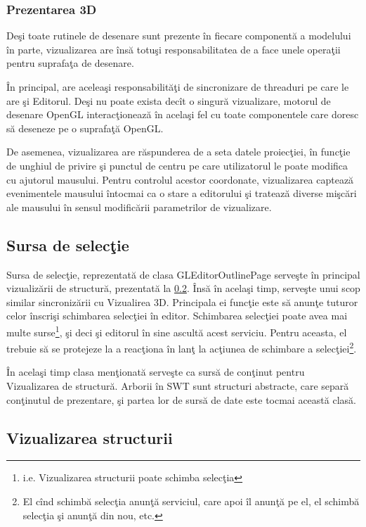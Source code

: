 \subsubsection{Prezentarea 3D}
Deşi toate rutinele de desenare sunt prezente în fiecare componentă a modelului
în parte, vizualizarea are însă totuşi responsabilitatea de a face unele
operaţii pentru suprafaţa de desenare.

În principal, are aceleaşi responsabilităţi de sincronizare de threaduri pe care
le are şi Editorul. Deşi nu poate exista decît o singură vizualizare, motorul de
desenare OpenGL interacţionează în acelaşi fel cu toate componentele care doresc
să deseneze pe o suprafaţă OpenGL.

De asemenea, vizualizarea are răspunderea de a seta datele proiecţiei, în
funcţie de unghiul de privire şi punctul de centru pe care utilizatorul le poate
modifica cu ajutorul mausului. Pentru controlul acestor coordonate, vizualizarea
captează evenimentele mausului întocmai ca o stare a editorului şi tratează
diverse mişcări ale mausului în sensul modificării parametrilor de vizualizare.

\subsection{Sursa de selecţie}
\label{section:impl-selecta}
Sursa de selecţie, reprezentată de clasa GLEditorOutlinePage serveşte în 
principal vizualizării de structură, prezentată la \ref{section:impl-outline}. 
Însă în acelaşi timp, serveşte unui scop similar sincronizării cu Vizualirea 
3D. Principala ei funcţie este să anunţe tuturor celor înscrişi schimbarea 
selecţiei în editor. Schimbarea selecţiei poate avea mai multe 
surse\footnote{i.e. Vizualizarea structurii poate schimba selecţia}, şi deci şi 
editorul în sine ascultă acest serviciu. Pentru aceasta, el trebuie să se
protejeze la a reacţiona în lanţ la acţiunea de schimbare a
selecţiei\footnote{El cînd schimbă selecţia anunţă serviciul, care apoi îl
anunţă pe el, el schimbă selecţia şi anunţă din nou, etc.}.

În acelaşi timp clasa menţionată serveşte ca sursă de conţinut pentru
Vizualizarea de structură. Arborii în SWT sunt structuri abstracte, care separă
conţinutul de prezentare, şi partea lor de sursă de date este tocmai această
clasă.

\subsection{Vizualizarea structurii}
\label{section:impl-outline}


